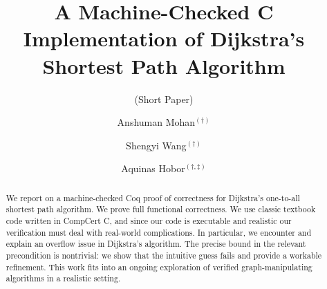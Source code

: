 \documentclass[runningheads]{llncs}
\title{A Machine-Checked C Implementation of Dijkstra's Shortest Path Algorithm}
\subtitle{(Short Paper)}
\begin{document}
\author{Anshuman Mohan$^{(\dagger)}$ \and Shengyi Wang$^{(\dagger)}$ \and Aquinas Hobor$^{(\dagger,\ddagger)}$}

%


\maketitle








\begin{abstract}
\vspace{-1.2em}
We report on a machine-checked Coq proof of correctness for
Dijkstra’s one-to-all shortest path algorithm.
We prove full functional correctness.
We use classic textbook code written in CompCert C, and since our
code is executable and realistic our verification
must deal with real-world complications.
In particular, we encounter and explain an overflow issue in
Dijkstra’s algorithm. The precise bound in the relevant precondition is
nontrivial: we show that the intuitive guess
fails and provide a workable refinement.
This work fits into an ongoing exploration of verified graph-manipulating
algorithms in a realistic setting.

\end{abstract} %
\end{document}
